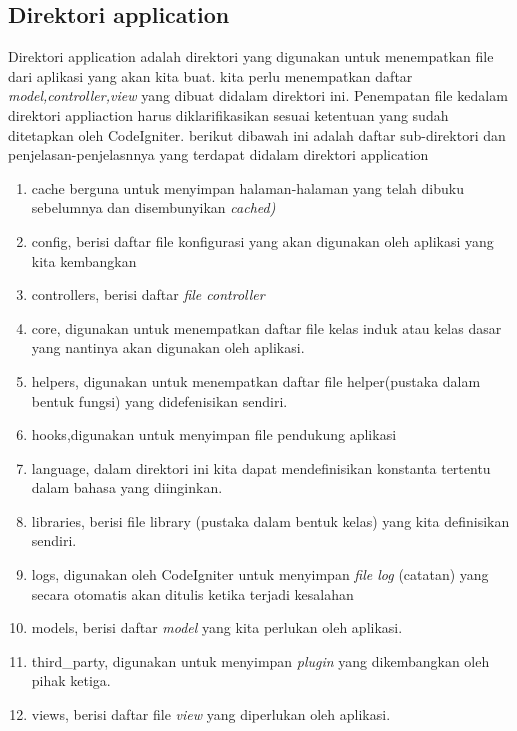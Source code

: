 \subsection {Direktori application}
Direktori application adalah direktori yang digunakan untuk menempatkan file dari aplikasi yang akan kita buat. kita perlu menempatkan daftar \textit{model,controller,view} yang dibuat didalam direktori ini.
Penempatan file kedalam direktori appliaction harus diklarifikasikan sesuai ketentuan yang sudah ditetapkan oleh CodeIgniter. berikut dibawah ini adalah daftar sub-direktori dan penjelasan-penjelasnnya yang terdapat didalam direktori application
\begin{enumerate}
\item cache berguna untuk menyimpan halaman-halaman yang telah dibuku sebelumnya dan disembunyikan \textit{cached)}
\item config, berisi daftar file konfigurasi yang akan digunakan oleh aplikasi yang kita kembangkan
\item controllers, berisi daftar \textit{file controller}
\item core, digunakan untuk menempatkan daftar file kelas induk atau kelas dasar yang nantinya akan digunakan oleh aplikasi.
\item helpers, digunakan untuk menempatkan daftar file helper(pustaka dalam bentuk fungsi) yang didefenisikan sendiri.
\item hooks,digunakan untuk menyimpan file pendukung aplikasi
\item language, dalam direktori ini kita dapat mendefinisikan konstanta tertentu dalam bahasa yang diinginkan.
\item libraries, berisi file library (pustaka dalam bentuk kelas) yang kita definisikan sendiri.
\item logs, digunakan oleh CodeIgniter untuk menyimpan \textit{file log} (catatan) yang secara otomatis akan ditulis ketika terjadi kesalahan
\item models, berisi daftar \textit{model} yang kita perlukan oleh aplikasi.
\item third\_party, digunakan untuk menyimpan \textit{plugin} yang dikembangkan oleh pihak ketiga.
\item views, berisi daftar file \textit{view} yang diperlukan oleh aplikasi.
\end{enumerate}

